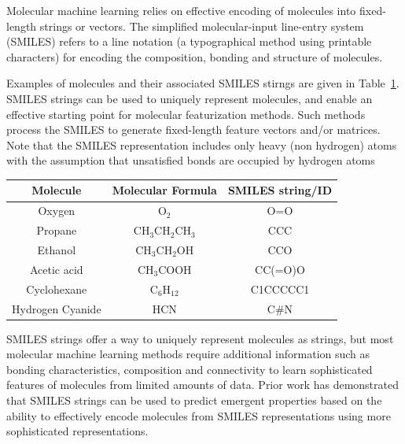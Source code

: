\documentclass[book.tex]{subfiles}
\begin{document}
Molecular machine learning relies on effective encoding of molecules into fixed-length strings or vectors. The simplified molecular-input line-entry system (SMILES) refers to a line notation (a typographical method using printable characters) for encoding the composition, bonding and structure of molecules. 

Examples of molecules and their associated SMILES stirngs are given in Table~\ref{table:smiles}. SMILES strings can be used to uniquely represent molecules, and enable an effective starting point for molecular featurization methods. Such methods process the SMILES to generate fixed-length feature vectors and/or matrices. Note that the SMILES representation includes only heavy (non hydrogen) atoms with the assumption that unsatisfied bonds are occupied by hydrogen atoms
\begin{table}[!ht]
\centering
\begin{tabular}{|c |c| c|}
\hline
Molecule & Molecular Formula & SMILES string/ID \\
\hline
Oxygen & O$_2$ & O=O \\
Propane & CH$_3$CH$_2$CH$_3$& CCC \\
Ethanol & CH$_3$CH$_2$OH & CCO \\
Acetic acid & CH$_3$COOH& CC(=O)O\\ 
Cyclohexane & C$_6$H$_{12}$&C1CCCCC1\\
Hydrogen Cyanide & HCN & C\#N\\
\hline
\end{tabular}
\label{table:smiles}
\end{table}

SMILES strings offer a way to uniquely represent molecules as strings, but most molecular machine learning methods require additional information such as bonding characteristics, composition and connectivity to learn sophisticated features of molecules from limited amounts of data. Prior work has demonstrated that SMILES strings can be used to predict emergent properties based on the ability to effectively encode molecules from SMILES representations using more sophisticated representations.

\end{document}
